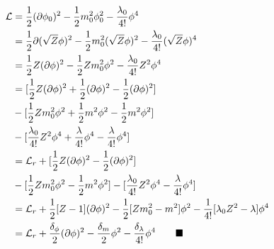 \begin{align*}
	\mathcal{L} &= \frac{1}{2} (\partial \phi_0)^2 -\frac{1}{2} m^2_0 \phi^2_0 - \frac{\lambda_0}{4!} \phi^4 \\
	&= \frac{1}{2} \partial(\sqrt{Z}\phi)^2-\frac{1}{2} m^2_0(\sqrt{Z}\phi)^2 - \frac{\lambda_0}{4!}(\sqrt{Z} \phi)^4 \\
	&= \frac{1}{2} Z(\partial \phi)^2 - \frac{1}{2} Z m^2_0 \phi^2 - \frac{\lambda_0}{4!} Z^2 \phi^4 \\
	&= [\frac{1}{2} Z(\partial \phi)^2+\frac{1}{2} (\partial \phi)^2-\frac{1}{2} (\partial \phi)^2] \\
	&-[\frac{1}{2} Zm^2_0 \phi^2+\frac{1}{2} m^2 \phi^2-\frac{1}{2} m^2\phi^2] \\
	&- [\frac{\lambda_0}{4!}Z^2\phi^4 + \frac{\lambda}{4!} \phi^4-\frac{\lambda}{4!}\phi^4 ]\\
	&= \mathcal{L}_r + [\frac{1}{2} Z(\partial \phi)^2-\frac{1}{2}(\partial \phi)^2]\\
	&-[\frac{1}{2} Z m^2_0 \phi^2-\frac{1}{2} m^2\phi^2] - [\frac{\lambda_0}{4!} Z^2 \phi^4 -\frac{\lambda}{4!} \phi^4] \\
	&=\mathcal{L}_r + \frac{1}{2} [Z-1] (\partial \phi)^2 - \frac{1}{2} [Zm^2_0-m^2] \phi^2-\frac{1}{4!} [\lambda_0 Z^2-\lambda] \phi^4\\
	&= \mathcal{L}_r+ \frac{\delta_\phi}{2} (\partial \phi)^2 -\frac{\delta_m}{2} \phi^2 - \frac{\delta_\lambda}{4!}\phi^4 \qquad \blacksquare
\end{align*}
